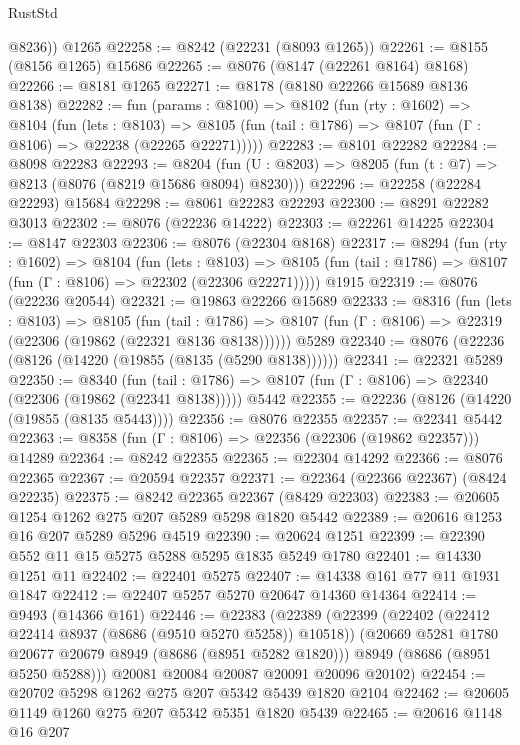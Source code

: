 \begin{lexlean}{RustStd}
\begin{coremodule}
        @8236))
    @1265
@22258 := @8242 (@22231 (@8093 @1265))
@22261 := @8155 (@8156 @1265) @15686
@22265 := @8076 (@8147 (@22261 @8164) @8168)
@22266 := @8181 @1265
@22271 := @8178 (@8180 @22266 @15689 @8136 @8138)
@22282 := fun (params : @8100) =>
  @8102
    (fun (rty : @1602) =>
    @8104
      (fun (lets : @8103) =>
      @8105 (fun (tail : @1786) => @8107 (fun (Γ : @8106) => @22238 (@22265 @22271)))))
@22283 := @8101 @22282
@22284 := @8098 @22283
@22293 := @8204
    (fun (U : @8203) => @8205 (fun (t : @7) => @8213 (@8076 (@8219 @15686 @8094) @8230)))
@22296 := @22258 (@22284 @22293) @15684
@22298 := @8061 @22283 @22293
@22300 := @8291 @22282 @3013
@22302 := @8076 (@22236 @14222)
@22303 := @22261 @14225
@22304 := @8147 @22303
@22306 := @8076 (@22304 @8168)
@22317 := @8294
    (fun (rty : @1602) =>
    @8104
      (fun (lets : @8103) =>
      @8105 (fun (tail : @1786) => @8107 (fun (Γ : @8106) => @22302 (@22306 @22271)))))
    @1915
@22319 := @8076 (@22236 @20544)
@22321 := @19863 @22266 @15689
@22333 := @8316
    (fun (lets : @8103) =>
    @8105
      (fun (tail : @1786) =>
      @8107 (fun (Γ : @8106) => @22319 (@22306 (@19862 (@22321 @8136 @8138))))))
    @5289
@22340 := @8076 (@22236 (@8126 (@14220 (@19855 (@8135 (@5290 @8138))))))
@22341 := @22321 @5289
@22350 := @8340
    (fun (tail : @1786) => @8107 (fun (Γ : @8106) => @22340 (@22306 (@19862 (@22341 @8138)))))
    @5442
@22355 := @22236 (@8126 (@14220 (@19855 (@8135 @5443))))
@22356 := @8076 @22355
@22357 := @22341 @5442
@22363 := @8358 (fun (Γ : @8106) => @22356 (@22306 (@19862 @22357))) @14289
@22364 := @8242 @22355
@22365 := @22304 @14292
@22366 := @8076 @22365
@22367 := @20594 @22357
@22371 := @22364 (@22366 @22367) (@8424 @22235)
@22375 := @8242 @22365 @22367 (@8429 @22303)
@22383 := @20605 @1254 @1262 @275 @207 @5289 @5298 @1820 @5442
@22389 := @20616 @1253 @16 @207 @5289 @5296 @4519
@22390 := @20624 @1251
@22399 := @22390 @552 @11 @15 @5275 @5288 @5295 @1835 @5249 @1780
@22401 := @14330 @1251 @11
@22402 := @22401 @5275
@22407 := @14338 @161 @77 @11 @1931 @1847
@22412 := @22407 @5257 @5270 @20647 @14360 @14364
@22414 := @9493 (@14366 @161)
@22446 := @22383
    (@22389
      (@22399
        (@22402 (@22412 @22414 @8937 (@8686 (@9510 @5270 @5258)) @10518))
        (@20669 @5281 @1780 @20677 @20679 @8949 (@8686 (@8951 @5282 @1820)))
        @8949
        (@8686 (@8951 @5250 @5288)))
      @20081
      @20084
      @20087
      @20091
      @20096
      @20102)
@22454 := @20702 @5298 @1262 @275 @207 @5342 @5439 @1820 @2104
@22462 := @20605 @1149 @1260 @275 @207 @5342 @5351 @1820 @5439
@22465 := @20616 @1148 @16 @207

\end{coremodule}
\end{lexlean}
